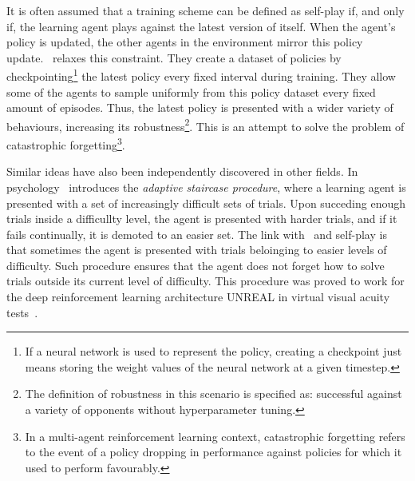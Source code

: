 \documentclass{../main.tex}{}
\begin{document}
It is often assumed that a training scheme can be defined as self-play if, and only if, the learning agent plays against the latest version of itself. When the agent's policy is updated, the other agents in the environment mirror this policy update.~\citep{Bansal2017} relaxes this constraint. They create a dataset of policies by checkpointing\footnote{If a neural network is used to represent the policy, creating a checkpoint just means storing the weight values of the neural network at a given timestep.} the latest policy every fixed interval during training. They allow some of the agents to sample uniformly from this policy dataset every fixed amount of episodes. Thus, the latest policy is presented with a wider variety of behaviours, increasing its robustness\footnote{The definition of robustness in this scenario is specified as: successful against a variety of opponents without hyperparameter tuning.}. This is an attempt to solve the problem of catastrophic forgetting\footnote{In a multi-agent reinforcement learning context, catastrophic forgetting refers to the event of a policy dropping in performance against policies for which it used to perform favourably.}.

Similar ideas have also been independently discovered in other fields. In psychology~\cite{Treutwein1995} introduces the \textit{adaptive staircase procedure}, where a learning agent is presented with a set of increasingly difficult sets of trials. Upon succeding enough trials inside a difficullty level, the agent is presented with harder trials, and if it fails continually, it is demoted to an easier set. The link with~\citep{Bansal2017} and self-play is that sometimes the agent is presented with trials beloinging to easier levels of difficulty. Such procedure ensures that the agent does not forget how to solve trials outside its current level of difficulty. This procedure was proved to work for the deep reinforcement learning architecture UNREAL \citep{Beattie2016} in virtual visual acuity tests~\citep{Leibo2018}.
\end{document}
